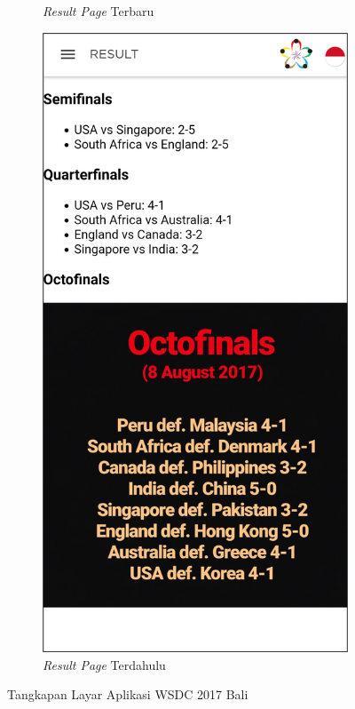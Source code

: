 \begin{figure}[H]
\begin{subfigure}[b]{0.3\textwidth}
         \caption{\textit{Result Page} Terbaru}
         \label{fig:ssResult}
     \end{subfigure}
     \hspace*{0.5in}
     \begin{subfigure}[b]{0.3\textwidth}
         \centering
         \includegraphics[width=\textwidth]{Gambar/ResultPage.png}
         \caption{\textit{Result Page} Terdahulu}
         \label{fig:ssResultOld}
     \end{subfigure}
        \caption{Tangkapan Layar Aplikasi WSDC 2017 Bali}
        \label{fig:ssApk1}
\end{figure}


